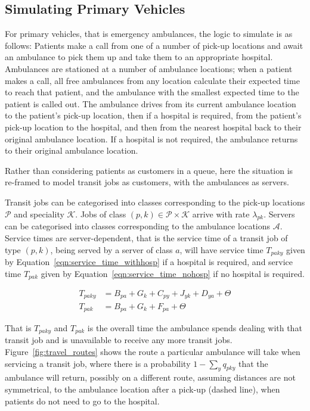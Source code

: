 \documentclass[preprint,12pt]{elsarticle}
\begin{document}
\subsection{Simulating Primary Vehicles}\label{sec:simulation_primary} For
primary vehicles, that is emergency ambulances, the logic to simulate is as
follows: Patients make a call from one of a number of pick-up locations and
await an ambulance to pick them up and take them to an appropriate hospital.
Ambulances are stationed at a number of ambulance locations; when a patient
makes a call, all free ambulances from any location calculate their expected
time to reach that patient, and the ambulance with the smallest expected time to
the patient is called out.  The ambulance drives from its current ambulance
location to the patient's pick-up location, then if a hospital is required, from
the patient's pick-up location to the hospital, and then from the nearest
hospital back to their original ambulance location.  If a hospital is not
required, the ambulance returns to their original ambulance location.

Rather than considering patients as customers in a queue, here the situation is
re-framed to model transit jobs as customers, with the ambulances as servers.

Transit jobs can be categorised into classes corresponding to the pick-up
locations $\mathcal{P}$ and speciality $\mathcal{K}$. Jobs of class $(p, k) \in
\mathcal{P} \times \mathcal{K}$ arrive with rate $\lambda_{pk}$. Servers can be
categorised into classes corresponding to the ambulance locations $\mathcal{A}$.
Service times are server-dependent, that is the service time of a transit job of
type $(p, k)$, being served by a server of class $a$, will have service time
$T_{paky}$ given by Equation~\ref{eqn:service_time_withhosp} if a hospital is
required, and service time $T_{pak}$ given by
Equation~\ref{eqn:service_time_nohosp} if no hospital is required.

\begin{align} T_{paky} &= B_{pa} + G_k + C_{py} + J_{yk} + D_{ya} + \Theta
\label{eqn:service_time_withhosp} \\ T_{pak} &= B_{pa} + G_k + F_{pa} + \Theta
\label{eqn:service_time_nohosp} \end{align}

That is $T_{paky}$ and $T_{pak}$ is the overall time the ambulance spends
dealing with that transit job and is unavailable to receive any more transit
jobs. Figure~\ref{fig:travel_routes} shows the route a particular ambulance will
take when servicing a transit job, where there is a probability $1 - \sum_{y}
q_{pky}$ that the ambulance will return, possibly on a different route, assuming
distances are not symmetrical, to the ambulance location after a pick-up (dashed
line), when patients do not need to go to the hospital.
\end{document}
